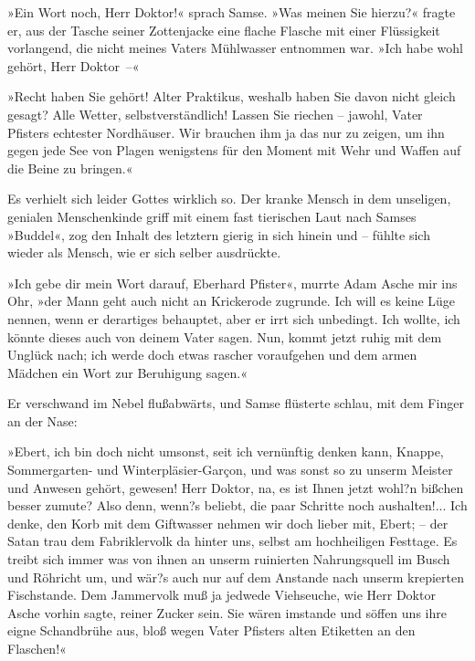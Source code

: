 »Ein Wort noch, Herr Doktor!« sprach Samse. »Was meinen Sie
hierzu?« fragte er, aus der Tasche seiner Zottenjacke eine flache
Flasche mit einer Flüssigkeit vorlangend, die nicht meines Vaters
Mühlwasser entnommen war. »Ich habe wohl gehört, Herr Doktor~–«

»Recht haben Sie gehört! Alter Praktikus, weshalb haben Sie davon
nicht gleich gesagt? Alle Wetter, selbstverständlich! Lassen Sie
riechen – jawohl, Vater Pfisters echtester Nordhäuser. Wir brauchen
ihm ja das nur zu zeigen, um ihn gegen jede See von Plagen
wenigstens für den Moment mit Wehr und Waffen auf die Beine zu
bringen.«

Es verhielt sich leider Gottes wirklich so. Der kranke Mensch in
dem unseligen, genialen Menschenkinde griff mit einem fast
tierischen Laut nach Samses »Buddel«, zog den Inhalt des letztern
gierig in sich hinein und – fühlte sich wieder als Mensch, wie er
sich selber ausdrückte.

»Ich gebe dir mein Wort darauf, Eberhard Pfister«, murrte Adam
Asche mir ins Ohr, »der Mann geht auch nicht an Krickerode
zugrunde. Ich will es keine Lüge nennen, wenn er derartiges
behauptet, aber er irrt sich unbedingt. Ich wollte, ich könnte
dieses auch von deinem Vater sagen. Nun, kommt jetzt ruhig mit dem
Unglück nach; ich werde doch etwas rascher voraufgehen und dem
armen Mädchen ein Wort zur Beruhigung sagen.«

Er verschwand im Nebel flußabwärts, und Samse flüsterte schlau, mit
dem Finger an der Nase:

»Ebert, ich bin doch nicht umsonst, seit ich vernünftig denken
kann, Knappe, Sommergarten- und Winterpläsier-Garçon, und was sonst
so zu unserm Meister und Anwesen gehört, gewesen! Herr Doktor, na,
es ist Ihnen jetzt wohl?n bißchen besser zumute? Also denn, wenn?s
beliebt, die paar Schritte noch aushalten!... Ich denke, den Korb
mit dem Giftwasser nehmen wir doch lieber mit, Ebert; – der Satan
trau dem Fabriklervolk da hinter uns, selbst am hochheiligen
Festtage. Es treibt sich immer was von ihnen an unserm ruinierten
Nahrungsquell im Busch und Röhricht um, und wär?s auch nur auf dem
Anstande nach unserm krepierten Fischstande. Dem Jammervolk muß ja
jedwede Viehseuche, wie Herr Doktor Asche vorhin sagte, reiner
Zucker sein. Sie wären imstande und söffen uns ihre eigne
Schandbrühe aus, bloß wegen Vater Pfisters alten Etiketten an den
Flaschen!«

